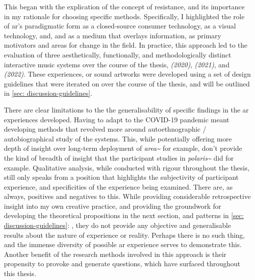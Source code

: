 \begin{enumerate}
    \RQmedium
    \RQexperience
    \RQfuture
\end{enumerate}

This began with the explication of the concept of resistance, and its importance in my rationale for choosing specific methods. Specifically, I highlighted the role of \gls{ar}'s paradigmatic form as a closed-source consumer technology, as a visual technology, and, and as a medium that overlays information, as primary motivators and areas for change in the field. In practice, this approach led to the evaluation of three aesthetically, functionally, and methodologically distinct interactive music systems over the course of the thesis, \textit{ (2020)}, \textit{ (2021)}, and \textit{ (2022)}. These experiences, or sound \gls{art}works were developed using a set of design guidelines that were iterated on over the course of the thesis, and will be outlined in \autoref{sec: discussion-guidelines}. 

There are clear limitations to the the generalisability of specific findings in the \gls{ar} experiences developed. Having to adapt to the COVID-19 pandemic meant developing methods that revolved more around autoethnographic / autobiographical study of the systems. This, while potentially offering more depth of insight over long-term deployment of \textit{area\textasciitilde{}} for example, don't provide the kind of breadth of insight that the participant studies in \textit{polaris\textasciitilde{}} did for example. Qualitative analysis, while conducted with rigour throughout the thesis, still only speaks from a position that highlights the subjectivity of participant experience, and specificities of the experience being examined. There are, as always, positives and negatives to this. While providing considerable retrospective insight into my own creative practice, and providing the groundwork for developing the theoretical propositions in the next section, and patterns in \autoref{sec: discussion-guidelines}: , they do not provide any objective and generalisable results about the nature of experience or reality. Perhaps there is no such thing, and the immense diversity of possible \gls{ar} experience serves to demonstrate this. Another benefit of the research methods involved in this approach is their propensity to provoke and generate questions, which have surfaced throughout this thesis.



